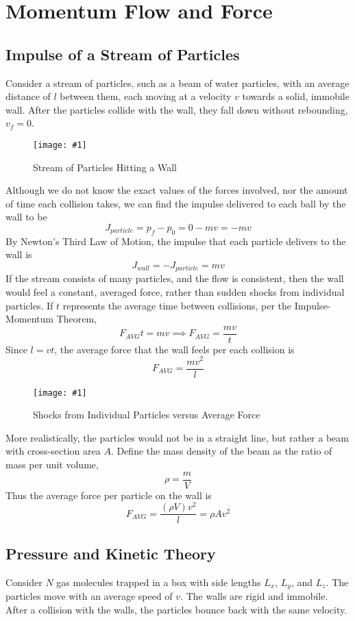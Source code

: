 \documentclass[11pt]{article}
\newcommand{\fig}[4]{
    \begin{figure}[H]
        \centering
        \texttt{[image: \#1]}
        \caption{#2}
        \label{exp4fit}
    \end{figure}
}
\theoremstyle{gangnamstyle}{\newtheorem{definition}{Definition}[]}
\theoremstyle{gangnamstyle}{\newtheorem{example}{Example}[]}
\theoremstyle{gangnamstyle}{\newtheorem{problem}{Problem}[]}
\theoremstyle{gangnamstyle}{\newtheorem{warning}{Warning}[]}
\begin{document}

\section{Momentum Flow and Force}

\subsection{Impulse of a Stream of Particles}

Consider a stream of particles, such as a beam of water particles, with an average distance of $l$ between them, each moving at a velocity $v$ towards a solid, immobile wall. After the particles collide with the wall, they fall down without rebounding, $v_f = 0$. 
\fig{figs/n4/stream.png}{Stream of Particles Hitting a Wall}{0.5}{0}
Although we do not know the exact values of the forces involved, nor the amount of time each collision takes, we can find the impulse delivered to each ball by the wall to be 
\[ J_{particle} = p_f - p_0 = 0 - mv = -mv \]
By Newton's Third Law of Motion, the impulse that each particle delivers to the wall is 
\[ J_{wall} = -J_{particle} = mv \]
If the stream consists of many particles, and the flow is consistent, then the wall would feel a constant, averaged force, rather than sudden shocks from individual particles. If $t$ represents the average time between collisions, per the Impulse-Momentum Theorem, 
\[ F_{AVG}t = mv \implies F_{AVG} = \frac{mv}{t} \]
Since $l = vt$, the average force that the wall feels per each collision is
\[ F_{AVG} = \frac{mv^2}{l} \]
\fig{figs/n4/force.png}{Shocks from Individual Particles versus Average Force}{0.45}{0}

More realistically, the particles would not be in a straight line, but rather a beam with cross-section area $A$. Define the mass density of the beam as the ratio of mass per unit volume, 
\[ \rho = \frac{m}{V} \]
Thus the average force per particle on the wall is
\[ F_{AVG} = \frac{(\rho V)v^2}{l} = \rho Av^2 \]

\subsection{Pressure and Kinetic Theory}

Consider $N$ gas molecules trapped in a box with side lengths $L_x$, $L_y$, and $L_z$. The particles move with an average speed of $v$. The walls are rigid and immobile. After a collision with the walls, the particles bounce back with the same velocity. 
\end{document}
